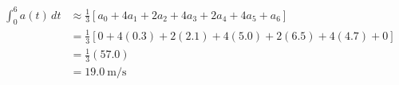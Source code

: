 \documentclass[preview]{standalone}
\begin{document}
\begin{align*}
\begin{aligned*}\int_0^{6} a(t)\,dt &\approx \frac{1}{3}\left[ a_0 + 4a_1 + 2a_2 + 4a_3 + 2a_4 + 4a_5 + a_6 \right] \\[4pt]&= \frac{1}{3} \left[ 0 + 4(0.3) + 2(2.1) + 4(5.0) + 2(6.5) + 4(4.7) + 0 \right] \\[4pt]&= \frac{1}{3}(57.0) \\[4pt]&= 19.0\ \text{m/s}\end{aligned*}
\end{align*}
\end{document}
